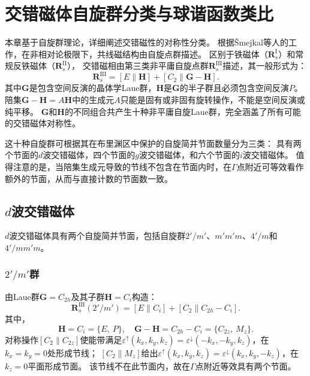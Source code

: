 \chapter{交错磁体自旋群分类与球谐函数类比}
\label{classification}

本章基于自旋群理论，详细阐述交错磁性的对称性分类。
根据Šmejkal等人的工作\cite{Smejkal2022PRX}，在非相对论极限下，共线磁结构由自旋点群描述。
区别于铁磁体（$\mathbf{R}_s^{\mathrm{I}}$）和常规反铁磁体（$\mathbf{R}_s^{\mathrm{II}}$），
交错磁相由第三类非平庸自旋点群$\mathbf{R}_s^{\mathrm{III}}$描述，其一般形式为：
\begin{equation}
\mathbf{R}_s^{\mathrm{III}} = [E\|\mathbf{H}] + [C_2\|\mathbf{G}-\mathbf{H}].
\label{eq:R3_general}
\end{equation}
其中$\mathbf{G}$是包含空间反演的晶体学Laue群，$\mathbf{H}$是$\mathbf{G}$的半子群且必须包含空间反演$P$。
陪集$\mathbf{G}-\mathbf{H}=A\mathbf{H}$中的生成元$A$只能是固有或非固有旋转操作，不能是空间反演或纯平移\cite{Smejkal2022PRX}。
$\mathbf{G}$和$\mathbf{H}$的不同组合共产生十种非平庸自旋Laue群，完全涵盖了所有可能的交错磁体对称性。

这十种自旋群可根据其在布里渊区中保护的自旋简并节面数量分为三类：
具有两个节面的$d$波交错磁体，四个节面的$g$波交错磁体，和六个节面的$i$波交错磁体\cite{Smejkal2022PRX,Smejkal2022Landscape,liu_symmetry_2026}。
值得注意的是，当陪集生成元导致的节线不包含在节面内时，在$\Gamma$点附近可等效看作额外的节面，从而与直接计数的节面数一致。

\section{$d$波交错磁体}\label{sec:d-wave}

$d$波交错磁体具有两个自旋简并节面，包括自旋群$2'/m'$、$m'm'm$、$4'/m$和$4'/mm'm$。

\subsection*{$2'/m'$群}
由Laue群$\mathbf{G}=C_{2h}$及其子群$\mathbf{H}=C_i$构造：
\[
\mathbf{R}_s^{\mathrm{III}}(2'/m') = [E\|C_i] + [C_2\|C_{2h}-C_i].
\]
其中，
\[
\mathbf{H}=C_i = \{E,\ P\},\quad
\mathbf{G}-\mathbf{H}=C_{2h}-C_i = \{C_{2z},\ M_z\}.
\]
对称操作$[C_2\|C_{2z}]$使能带满足$\varepsilon^{\uparrow}(k_x,k_y,k_z)=\varepsilon^{\downarrow}(-k_x,-k_y,k_z)$，在$k_x=k_y=0$处形成节线；
$[C_2\|M_z]$给出$\varepsilon^{\uparrow}(k_x,k_y,k_z)=\varepsilon^{\downarrow}(k_x,k_y,-k_z)$，在$k_z=0$平面形成节面。
该节线不在此节面内，故在$\Gamma$点附近等效具有两个节面。

